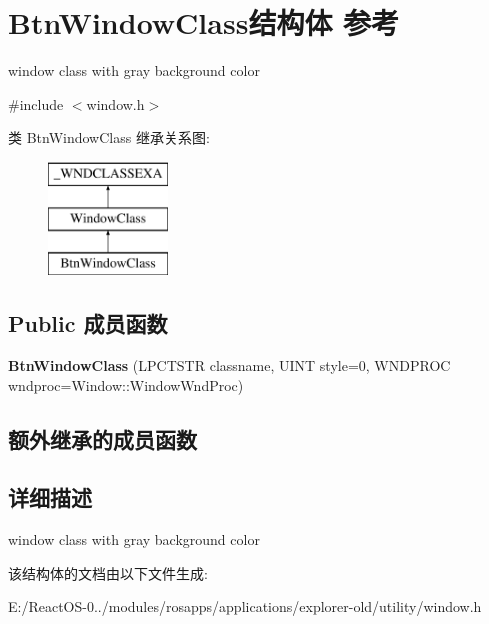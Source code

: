 \hypertarget{struct_btn_window_class}{}\section{Btn\+Window\+Class结构体 参考}
\label{struct_btn_window_class}


window class with gray background color  




{\ttfamily \#include $<$window.\+h$>$}

类 Btn\+Window\+Class 继承关系图\+:\begin{figure}[H]
\begin{center}
\leavevmode
\includegraphics[height=3.000000cm]{struct_btn_window_class}
\end{center}
\end{figure}
\subsection*{Public 成员函数}
\begin{DoxyCompactItemize}
\item 
\mbox{\label{struct_btn_window_class_a3fa46d75826bd3d99e61cf035033c9c6}} 
{\bfseries Btn\+Window\+Class} (L\+P\+C\+T\+S\+TR classname, U\+I\+NT style=0, W\+N\+D\+P\+R\+OC wndproc=Window\+::\+Window\+Wnd\+Proc)
\end{DoxyCompactItemize}
\subsection*{额外继承的成员函数}


\subsection{详细描述}
window class with gray background color 

该结构体的文档由以下文件生成\+:\begin{DoxyCompactItemize}
\item 
E\+:/\+React\+O\+S-\/0../modules/rosapps/applications/explorer-\/old/utility/window.\+h\end{DoxyCompactItemize}
